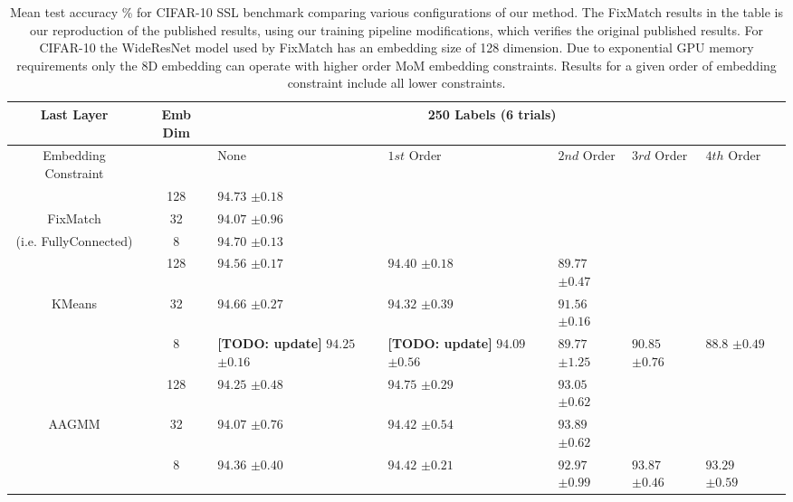 \documentclass[10pt,twocolumn,letterpaper]{article}
\newcommand{\TODO}[1]{\textbf{\color{red}[TODO: #1]}}
\begin{document}
\begin{table*}[ht!]
\begin{tabularx}{\textwidth}{c|c|XXXXXX}
		\hline\hline
		Last Layer  &   Emb Dim  & \multicolumn{5}{c}{250 Labels (6 trials)}            \\ 
		\hline
		\multicolumn{1}{c|}{Embedding Constraint} &  & None & $1st$ Order & $2nd$ Order & $3rd$ Order & $4th$ Order  \\ 
		\hline
		& 128  & $94.73$ \scriptsize{$\pm 0.18$}   &  &  &  &   \\
		FixMatch\cite{sohn2020fixmatch} & 32  & $94.07$ \scriptsize{$\pm 0.96$}    &  &  &  &   \\
		(i.e. FullyConnected) & 8  & $94.70$ \scriptsize{$\pm 0.13$}      &  &  &  &   \\
		\hline
		& 128  & $94.56$ \scriptsize{$\pm 0.17$}    & $94.40$ \scriptsize{$\pm 0.18$} & $89.77$ \scriptsize{$\pm 0.47$} &  &  \\
		KMeans & 32  & $94.66$ \scriptsize{$\pm 0.27$}    & $94.32$ \scriptsize{$\pm 0.39$} & $91.56$ \scriptsize{$\pm 0.16$} &  &  \\
		& 8  & \TODO {update} $94.25$ \scriptsize{$\pm 0.16$}    & \TODO {update} $94.09$ \scriptsize{$\pm 0.56$} & $89.77$ \scriptsize{$\pm 1.25$} & $90.85$ \scriptsize{$\pm 0.76$} & $88.8$ \scriptsize{$\pm 0.49$}  \\
		\hline
		& 128  & $94.25$ \scriptsize{$\pm 0.48$}    & $\boldsymbol{94.75}$ \scriptsize{$\pm 0.29$} & $93.05$ \scriptsize{$\pm 0.62$} &  &  \\
		AAGMM  & 32  & $94.07$ \scriptsize{$\pm 0.76$}    & $94.42$ \scriptsize{$\pm 0.54$} & $93.89$ \scriptsize{$\pm 0.62$} &  &  \\
		& 8  & $94.36$ \scriptsize{$\pm 0.40$}    & $94.42$ \scriptsize{$\pm 0.21$} & $92.97$ \scriptsize{$\pm 0.99$} & $93.87$ \scriptsize{$\pm 0.46$} & $93.29$ \scriptsize{$\pm 0.59$} \\
	\end{tabularx}
	\caption{Mean test accuracy \% for CIFAR-10 SSL benchmark comparing various configurations of our method. The FixMatch results in the table is our reproduction of the published results, using our training pipeline modifications, which verifies the original published results. For CIFAR-10 the WideResNet model used by FixMatch has an embedding size of 128 dimension. Due to exponential GPU memory requirements only the 8D embedding can operate with higher order MoM embedding constraints. Results for a given order of embedding constraint include all lower constraints.}
	\label{table1}
\end{table*}
\end{document}
